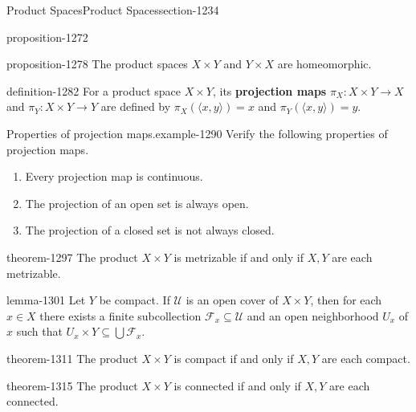 \documentclass[oneside,10pt,]{article}
\newcommand{\terminology}[1]{\textbf{#1}}
\newcommand{\tuple}[1]{\langle #1 \rangle}
\newcommand{\mc}{\mathcal}
\begin{document}
\begin{sectionptx}{Product Spaces}{}{Product Spaces}{}{}{section-1234}
\begin{proposition}{}{}{proposition-1272}
\end{proposition}
\begin{proposition}{}{}{proposition-1278}%
\hypertarget{p-1279}{}%
The product spaces \(X\times Y\) and \(Y\times X\) are homeomorphic.%
\end{proposition}
\begin{definition}{}{definition-1282}%
\hypertarget{p-1283}{}%
For a product space \(X\times Y\), its \terminology{projection maps} \(\pi_X:X\times Y\to X\) and \(\pi_Y:X\times Y\to Y\) are defined by \(\pi_X(\tuple{x,y})=x\) and \(\pi_Y(\tuple{x,y})=y\).%
\end{definition}
\begin{example}{Properties of projection maps.}{example-1290}%
\hypertarget{p-1292}{}%
Verify the following properties of projection maps.%
\leavevmode%
\begin{enumerate}
\item\hypertarget{li-1294}{}Every projection map is continuous.%
\item\hypertarget{li-1295}{}The projection of an open set is always open.%
\item\hypertarget{li-1296}{}The projection of a closed set is not always closed.%
\end{enumerate}
\end{example}
\begin{theorem}{}{}{theorem-1297}%
\hypertarget{p-1298}{}%
The product \(X\times Y\) is metrizable if and only if \(X,Y\) are each metrizable.%
\end{theorem}
\begin{lemma}{}{}{lemma-1301}%
\hypertarget{p-1302}{}%
Let \(Y\) be compact. If \(\mc U\) is an open cover of \(X\times Y\), then for each \(x\in X\) there exists a finite subcollection \(\mc F_x\subseteq\mc U\) and an open neighborhood \(U_x\) of \(x\) such that \(U_x\times Y\subseteq\bigcup\mc F_x\).%
\end{lemma}
\begin{theorem}{}{}{theorem-1311}%
\hypertarget{p-1312}{}%
The product \(X\times Y\) is compact if and only if \(X,Y\) are each compact.%
\end{theorem}
\begin{theorem}{}{}{theorem-1315}%
\hypertarget{p-1316}{}%
The product \(X\times Y\) is connected if and only if \(X,Y\) are each connected.%
\end{theorem}
\end{sectionptx}
%
%
\typeout{************************************************}
\end{document}
